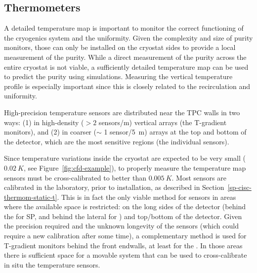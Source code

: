 \subsection{Thermometers}
\label{sec:fdgen-slow-cryo-therm}

A detailed \threed temperature map is important to monitor the correct functioning of the cryogenics system and the \lar uniformity.
Given the complexity and size of purity monitors, those can only be installed on the cryostat sides to provide a local measurement of
the \lar purity. While a direct measurement of the \lar purity across the entire cryostat is not viable, a sufficiently detailed \threed temperature map
can be used to predict the \lar purity using  simulations. Measuring the vertical temperature profile is especially important since this is closely related to
the \lar recirculation and uniformity. 

High-precision temperature sensors are distributed near the TPC walls in two ways:
(1) in high-density (\(>2\) sensors/\si{m}) vertical arrays (the T-gradient monitors), and (2) in coarser ($\sim$ 1 sensor/\SI{5}{m}) \twod arrays 
at the top and bottom of the detector, which are the most sensitive regions (the individual sensors).   

Since temperature variations inside the cryostat are expected to be very small ($\SI{0.02}{K}$, see Figure~\ref{fig:cfd-example}), to properly measure the \threed temperature map 
sensors must be cross-calibrated to better than $\SI{0.005}{K}$. Most sensors are calibrated in the laboratory, prior to installation,
as described in Section~\ref{sp-cisc-thermom-static-t}.  This is in fact the only viable method for sensors in areas where the available space is restricted: on the long sides of the detector
(behind the  for SP, and behind the lateral %
 for \dual) and top/bottom of the detector.
Given the precision required and the unknown longevity of the sensors (which could require a new calibration after some time), a complementary method
is used for T-gradient monitors behind the front endwalls, at least for the .
In those areas there is sufficient space for a movable system that can be used to cross-calibrate in situ
the temperature sensors. %

